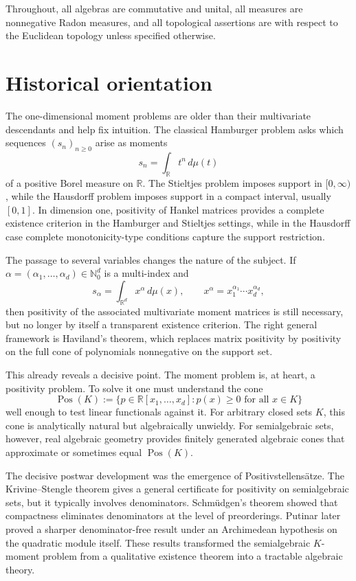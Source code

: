 \documentclass[11pt]{amsart}
\numberwithin{equation}{section}
\theoremstyle{definition}
\theoremstyle{remark}
\newcommand{\R}{\mathbb{R}}
\newcommand{\N}{\mathbb{N}}
\newcommand{\Rxd}{\R[x_1,\dots,x_d]}
\newcommand{\Pos}{\operatorname{Pos}}
\newcommand{\1}{\mathbf{1}}
\begin{document}
Throughout, all algebras are commutative and unital, all measures are nonnegative Radon measures, and all topological assertions are with respect to the Euclidean topology unless specified otherwise.

\section{Historical orientation}\label{sec:history}

The one-dimensional moment problems are older than their multivariate descendants and help fix intuition. The classical Hamburger problem asks which sequences \((s_n)_{n\ge 0}\) arise as moments
\[
s_n=\int_{\R} t^n\,d\mu(t)
\]
of a positive Borel measure on \(\R\). The Stieltjes problem imposes support in \([0,\infty)\), while the Hausdorff problem imposes support in a compact interval, usually \([0,1]\). In dimension one, positivity of Hankel matrices provides a complete existence criterion in the Hamburger and Stieltjes settings, while in the Hausdorff case complete monotonicity-type conditions capture the support restriction.

The passage to several variables changes the nature of the subject. If \(\alpha=(\alpha_1,\dots,\alpha_d)\in\N_0^d\) is a multi-index and
\[
s_\alpha=\int_{\R^d} x^\alpha\,d\mu(x), \qquad x^\alpha=x_1^{\alpha_1}\cdots x_d^{\alpha_d},
\]
then positivity of the associated multivariate moment matrices is still necessary, but no longer by itself a transparent existence criterion. The right general framework is Haviland's theorem, which replaces matrix positivity by positivity on the full cone of polynomials nonnegative on the support set.

This already reveals a decisive point. The moment problem is, at heart, a positivity problem. To solve it one must understand the cone
\[
\Pos(K):=\{p\in\Rxd: p(x)\ge 0\text{ for all }x\in K\}
\]
well enough to test linear functionals against it. For arbitrary closed sets \(K\), this cone is analytically natural but algebraically unwieldy. For semialgebraic sets, however, real algebraic geometry provides finitely generated algebraic cones that approximate or sometimes equal \(\Pos(K)\).

The decisive postwar development was the emergence of Positivstellens\"atze. The Krivine--Stengle theorem gives a general certificate for positivity on semialgebraic sets, but it typically involves denominators. Schm\"udgen's theorem showed that compactness eliminates denominators at the level of preorderings. Putinar later proved a sharper denominator-free result under an Archimedean hypothesis on the quadratic module itself. These results transformed the semialgebraic \(K\)-moment problem from a qualitative existence theorem into a tractable algebraic theory.
\end{document}
